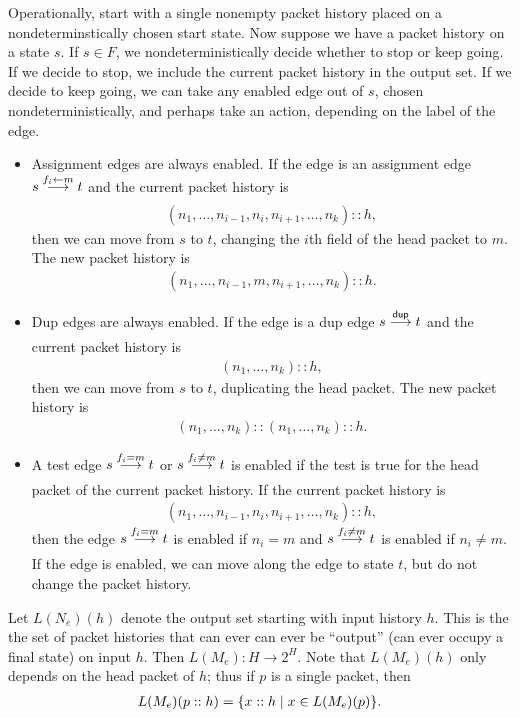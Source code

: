 \documentclass{article}
\newcommand\pdup{\mathop{\mathsf{dup}}}
\renewcommand\powerset[1]{2^{#1}}
\begin{document}
Operationally, start with a single nonempty packet history placed on a nondeterminstically chosen start state. Now suppose we have a packet history on a state $s$. If $s\in F$, we nondeterministically decide whether to stop or keep going. If we decide to stop, we include the current packet history in the output set. If we decide to keep going, we can take any enabled edge out of $s$, chosen nondeterministically, and perhaps take an action, depending on the label of the edge.
\begin{itemize}
\item
Assignment edges are always enabled. If the edge is an assignment edge $s\underset{}{\overset{f_i\leftarrow m}\longrightarrow}t$ and the current packet history is
\begin{align*}
(n_1,\ldots,n_{i-1},n_i,n_{i+1},\ldots,n_k)::h,
\end{align*}
then we can move from $s$ to $t$, changing the $i$th field of the head packet to $m$. The new packet history is
\begin{align*}
(n_1,\ldots,n_{i-1},m,n_{i+1},\ldots,n_k)::h.
\end{align*}
\item
Dup edges are always enabled. If the edge is a dup edge $s\goesto{\pdup}{}t$ and the current packet history is
\begin{align*}
(n_1,\ldots,n_k)::h,
\end{align*}
then we can move from $s$ to $t$, duplicating the head packet. The new packet history is
\begin{align*}
(n_1,\ldots,n_k)::(n_1,\ldots,n_k)::h.
\end{align*}
\item
A test edge $s\underset{}{\overset{f_i=m}\longrightarrow}t$ or $s\underset{}{\overset{f_i\neq m}\longrightarrow}t$ is enabled if the test is true for the head packet of the current packet history. If the current packet history is
\begin{align*}
(n_1,\ldots,n_{i-1},n_i,n_{i+1},\ldots,n_k)::h,
\end{align*}
then the edge $s\underset{}{\overset{f_i=m}\longrightarrow}t$ is enabled if $n_i=m$ and $s\underset{}{\overset{f_i\neq m}\longrightarrow}t$ is enabled if $n_i\neq m$.
If the edge is enabled, we can move along the edge to state $t$, but do not change the packet history.
\end{itemize}
Let $L(N_e)(h)$ denote the output set starting with input history $h$. This is the the set of packet histories that can ever can ever be ``output'' (can ever occupy a final state) on input $h$. Then $L(M_e):H\to\powerset H$. Note that $L(M_e)(h)$ only depends on the head packet of $h$; thus if $p$ is a single packet, then
\begin{align*}
L(M_e)(p::h) = \{x::h \mid x\in L(M_e)(p)\}.
\end{align*}
\end{document}
